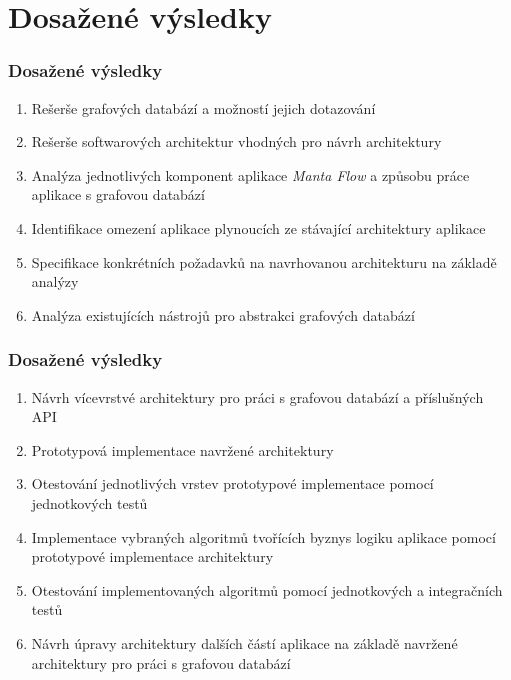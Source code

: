 \documentclass{beamer}
\newcounter{saveenumi}
\newcommand{\seti}{\setcounter{saveenumi}{\value{enumi}}}
\newcommand{\conti}{\setcounter{enumi}{\value{saveenumi}}}
\begin{document}
\section{Dosažené výsledky}
\begin{frame}
\frametitle{Dosažené výsledky}
   \begin{enumerate}
      \item Rešerše grafových databází a možností jejich dotazování
      \item Rešerše softwarových architektur vhodných pro návrh architektury
      \item Analýza jednotlivých komponent aplikace \textit{Manta Flow} a způsobu práce aplikace s grafovou databází
      \item Identifikace omezení aplikace plynoucích ze stávající architektury aplikace
      \item Specifikace konkrétních požadavků na navrhovanou architekturu na základě analýzy
      \item Analýza existujících nástrojů pro abstrakci grafových databází
      \seti
   \end{enumerate}
\end{frame}
\begin{frame}
\frametitle{Dosažené výsledky}
   \begin{enumerate}
      \conti
      \item Návrh vícevrstvé architektury pro práci s grafovou databází a příslušných API
      \item Prototypová implementace navržené architektury
      \item Otestování jednotlivých vrstev prototypové implementace pomocí jednotkových testů
      \item Implementace vybraných algoritmů tvořících byznys logiku aplikace pomocí prototypové implementace architektury
      \item Otestování implementovaných algoritmů pomocí jednotkových a integračních testů
      \item Návrh úpravy architektury dalších částí aplikace na základě navržené architektury pro práci s grafovou databází
   \end{enumerate}
\end{frame}
\end{document}
